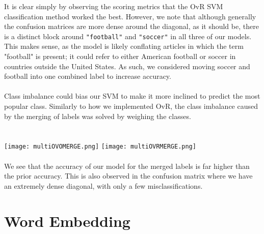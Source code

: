 \documentclass[11pt]{article}
\begin{document}
\begin{multicols}{2}
It is clear simply by observing the scoring metrics that the OvR SVM classification method worked the best. However, we note that although generally the confusion matrices are more dense around the diagonal, as it should be, there is a distinct block around \texttt{"football"} and \texttt{"soccer"} in all three of our models. This makes sense, as the model is likely conflating articles in which the term "football" is present; it could refer to either American football or soccer in countries outside the United States. As such, we considered moving soccer and football into one combined label to increase accuracy. \\\\
Class imbalance could bias our SVM to make it more inclined to predict the most popular class. Similarly to how we implemented OvR, the class imbalance caused by the merging of labels was solved by weighing the classes.\\\\
 \\
\texttt{[image: multiOVOMERGE.png]}
\texttt{[image: multiOVRMERGE.png]}\\\\
We see that the accuracy of our model for the merged labels is far higher than the prior accuracy. This is also observed in the confusion matrix where we have an extremely dense diagonal, with only a few misclassifications.

\section*{Word Embedding}

\end{multicols}
\end{document}
